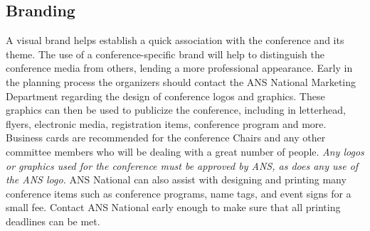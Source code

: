 \documentclass[12pt]{article}
\begin{document}
\subsection{Branding}
A visual brand helps establish a quick association with the conference and its theme.
The use of a conference-specific brand will help to distinguish the conference media from others, lending a more professional appearance.
Early in the planning process the organizers should contact the ANS National Marketing Department regarding the design of conference logos and graphics.
These graphics can then be used to publicize the conference, including in letterhead, flyers, electronic media, registration items, conference program and more. 
Business cards are recommended for the conference Chairs and any other committee members who will be dealing with a great number of people.
\emph{Any logos or graphics used for the conference must be approved by ANS, as does any use of the ANS logo.}
ANS National can also assist with designing and printing many conference items such as conference programs, name tags, and event signs for a small fee.
Contact ANS National early enough to make sure that all printing deadlines can be met.

\clearpage
\end{document}
